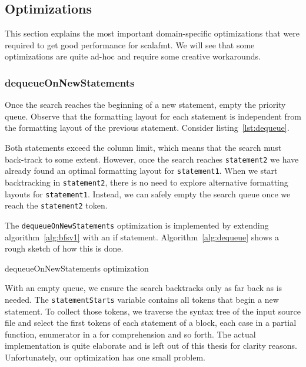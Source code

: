 \subsection{Optimizations}\label{sec:optimizations}
This section explains the most important domain-specific optimizations that were required to get good performance for scalafmt.
We will see that some optimizations are quite ad-hoc and require some creative workarounds.

\subsubsection{dequeueOnNewStatements}\label{sec:dequeue}
Once the search reaches the beginning of a new statement, empty the priority queue.
Observe that the formatting layout for each statement is independent from the formatting layout of the previous statement.
Consider listing~\ref{lst:dequeue}.

Both statements exceed the column limit, which means that the search must back-track to some extent.
However, once the search reaches \texttt{statement2} we have already found an optimal formatting layout for \texttt{statement1}.
When we start backtracking in \texttt{statement2}, there is no need to explore alternative formatting layouts for \texttt{statement1}.
Instead, we can safely empty the search queue once we reach the \texttt{statement2} token.

The \texttt{dequeueOnNewStatements} optimization is implemented by extending algorithm~\ref{alg:bfsv1} with an if statement.
Algorithm~\ref{alg:dequeue} shows a rough sketch of how this is done.
\begin{algorithm}
\caption{dequeueOnNewStatements optimization}\label{alg:dequeue}
  
\end{algorithm}
With an empty queue, we ensure the search backtracks only as far back as is needed.
The \texttt{statementStarts} variable contains all tokens that begin a new statement.
To collect those tokens, we traverse the syntax tree of the input source file and select the first tokens of each statement of a block, each case in a partial function, enumerator in a for comprehension and so forth.
The actual implementation is quite elaborate and is left out of this thesis for clarity reasons.
Unfortunately, our optimization has one small problem.

